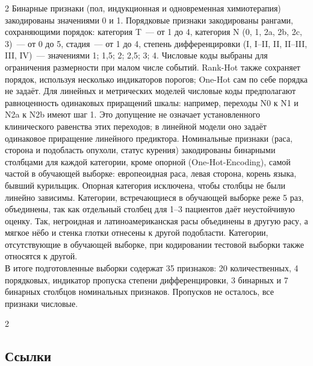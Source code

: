 \documentclass[11pt, a4paper]{article}
\begin{document}
\begin{multicols}{2}
Бинарные признаки (пол, индукционная и одновременная химиотерапия) закодированы значениями 0 и 1. Порядковые признаки закодированы рангами, сохраняющими порядок: категория T~--- от 1 до 4, категория N (0, 1, 2a, 2b, 2c, 3)~--- от 0 до 5, стадия~--- от 1 до 4, степень дифференцировки (I, I--II, II, II--III, III, IV)~--- значениями 1; 1,5; 2; 2,5; 3; 4. Числовые коды выбраны для ограничения размерности при малом числе событий. Rank-Hot также сохраняет порядок, используя несколько индикаторов порогов; One-Hot сам по себе порядка не задаёт. Для линейных и метрических моделей числовые коды предполагают равноценность одинаковых приращений шкалы: например, переходы N0 к N1 и N2a к N2b имеют шаг 1. Это допущение не означает установленного клинического равенства этих переходов; в линейной модели оно задаёт одинаковое приращение линейного предиктора. Номинальные признаки (раса, сторона и подобласть опухоли, статус курения) закодированы бинарными столбцами для каждой категории, кроме опорной (One-Hot-Encoding), самой частой в обучающей выборке: европеоидная раса, левая сторона, корень языка, бывший курильщик. Опорная категория исключена, чтобы столбцы не были линейно зависимы. Категории, встречающиеся в обучающей выборке реже 5 раз, объединены, так как отдельный столбец для 1--3 пациентов даёт неустойчивую оценку. Так, негроидная и латиноамериканская расы объединены в другую расу, а мягкое нёбо и стенка глотки отнесены к другой подобласти. Категории, отсутствующие в обучающей выборке, при кодировании тестовой выборки также относятся к другой.\vspace{6pt}\\
В итоге подготовленные выборки содержат 35 признаков: 20 количественных, 4 порядковых, индикатор пропуска степени дифференцировки, 3 бинарных и 7 бинарных столбцов номинальных признаков. Пропусков не осталось, все признаки числовые.

\end{multicols}

\FloatBarrier
\begin{multicols}{2}
\subsection*{Ссылки}
\printbibliography[heading=none]
\end{multicols}
\end{document}
